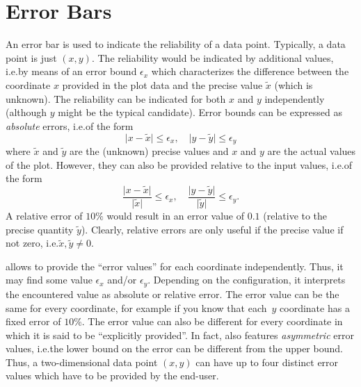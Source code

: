 
\section{Error Bars}
\label{sec:errorbars}

{
\def\pgfplotserror#1{\ensuremath{\epsilon_{#1}}}

An error bar is used to indicate the reliability of a data point. Typically, a
data point is just $(x,y)$. The reliability would be indicated by additional
values, i.e.\@ by means of an error bound $\pgfplotserror{x}$ which
characterizes the difference between the coordinate $x$ provided in the plot
data and the precise value $\tilde x$ (which is unknown). The reliability can
be indicated for both $x$ and $y$ independently (although $y$ might be the
typical candidate). Error bounds can be expressed as \emph{absolute} errors,
i.e.\@ of the form
%
    \begin{equation*}
        \lvert{x-\tilde x}\rvert \le \pgfplotserror{x}, \quad
        \lvert{y-\tilde y}\rvert \le \pgfplotserror{y}
    \end{equation*}
%
where $\tilde x$ and $\tilde y$ are the (unknown) precise values and $x$ and
$y$ are the actual values of the plot. However, they can also be provided
relative to the input values, i.e.\@ of the form
%
    \begin{equation*}
        \frac{\lvert{x-\tilde x}\rvert} {\lvert\tilde x\rvert} \le \pgfplotserror{x},
            \quad
        \frac{\lvert{y-\tilde y}\rvert} {\lvert\tilde y\rvert} \le \pgfplotserror{y}.
    \end{equation*}
%
A relative error of $10\%$ would result in an error value of $0.1$ (relative to
the precise quantity $\tilde y$). Clearly, relative errors are only useful if
the precise value if not zero, i.e.\@ $\tilde x, \tilde y \neq 0$.

\PGFPlots{} allows to provide the ``error values'' for each coordinate
independently. Thus, it may find some value $\pgfplotserror{x}$ and/or
$\pgfplotserror{y}$. Depending on the configuration, it interprets the
encountered value as absolute or relative error. The error value can be the
same for every coordinate, for example if you know that each~$y$ coordinate has
a fixed error of $10\%$. The error value can also be different for every
coordinate in which it is said to be ``explicitly provided''. In fact,
\PGFPlots{} also features \emph{asymmetric} error values, i.e.\@ the lower
bound on the error can be different from the upper bound. Thus, a
two-dimensional data point $(x,y)$ can have up to four distinct error values
which have to be provided by the end-user.

}
